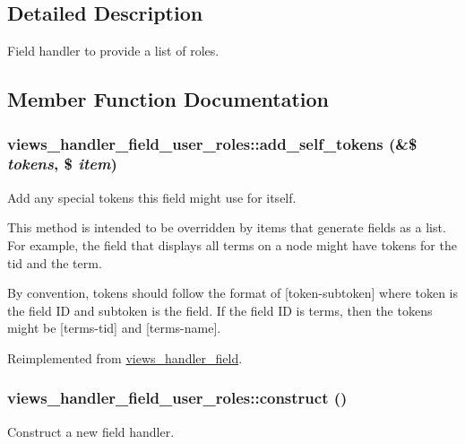 \subsection{Detailed Description}
Field handler to provide a list of roles. 

\subsection{Member Function Documentation}
\hypertarget{classviews__handler__field__user__roles_aceb9ebe1ca046eec3634c85bb6b114f5}{
\subsubsection[{add\_\-self\_\-tokens}]{\setlength{\rightskip}{0pt plus 5cm}views\_\-handler\_\-field\_\-user\_\-roles::add\_\-self\_\-tokens (\&\$ {\em tokens}, \/  \$ {\em item})}}
\label{classviews__handler__field__user__roles_aceb9ebe1ca046eec3634c85bb6b114f5}
Add any special tokens this field might use for itself.

This method is intended to be overridden by items that generate fields as a list. For example, the field that displays all terms on a node might have tokens for the tid and the term.

By convention, tokens should follow the format of \mbox{[}token-\/subtoken\mbox{]} where token is the field ID and subtoken is the field. If the field ID is terms, then the tokens might be \mbox{[}terms-\/tid\mbox{]} and \mbox{[}terms-\/name\mbox{]}. 

Reimplemented from \hyperlink{classviews__handler__field_ac61cc83a4c8c579993a254b5b1e16cbc}{views\_\-handler\_\-field}.\hypertarget{classviews__handler__field__user__roles_abf8254566ae390355b35d4593514b033}{
\subsubsection[{construct}]{\setlength{\rightskip}{0pt plus 5cm}views\_\-handler\_\-field\_\-user\_\-roles::construct ()}}
\label{classviews__handler__field__user__roles_abf8254566ae390355b35d4593514b033}
Construct a new field handler. 

